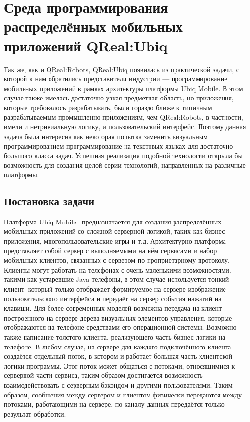 \section{Среда программирования распределённых мобильных приложений QReal:Ubiq}
\label{chapter:qRealUbiq}
Так же, как и QReal:Robots, QReal:Ubiq появилась из практической задачи, с которой к нам 
обратились представители индустрии --- программирование мобильных приложений в рамках архитектуры 
платформы Ubiq Mobile. В этом случае также имелась достаточно узкая предметная область, 
но приложения, которые требовалось разрабатывать, были гораздо ближе к типичным разрабатываемым 
промышленно приложениям, чем QReal:Robots, в частности, имели и нетривиальную логику, и 
пользовательский интерфейс. Поэтому данная задача была интересна как некоторая попытка 
заменить визуальным программированием программирование на текстовых языках для достаточно 
большого класса задач. Успешная реализация подобной технологии открыла бы возможность 
для создания целой серии технологий, направленных на различные платформы.

\subsection{Постановка задачи}
Платформа Ubiq Mobile~\cite{onossovski2009ubiq} предназначается для создания распределённых мобильных приложений со сложной серверной 
логикой, таких как бизнес-приложения, многопользовательские игры и т.д. Архитектурно 
платформа представляет собой сервер с выполняемыми на нём сервисами и набор мобильных 
клиентов, связанных с сервером по проприетарному протоколу. Клиенты могут работать 
на телефонах с очень маленькими возможностями, такими как устаревшие Java-телефоны, 
в этом случае используется тонкий клиент, который только отображает формируемое на 
сервере изображение пользовательского интерфейса и передаёт на сервер события нажатий 
на клавиши. Для более современных моделей возможна передача на клиент построенного 
на сервере дерева визуальных элементов управления, которые отображаются на телефоне 
средствами его операционной системы. Возможно также написание толстого клиента, реализующего 
часть бизнес-логики на телефоне. В любом случае, на сервере для каждого подключённого 
клиента создаётся отдельный поток, в котором и работает большая часть клиентской логики 
программы. Этот поток может общаться с потоками, относящимися к серверной части сервиса, 
таким образом достигается возможность взаимодействовать с серверным бэкэндом и другими 
пользователями. Таким образом, сообщения между сервером и клиентом физически передаются 
между потоками, работающими на сервере, по каналу данных передаётся только результат 
обработки.

